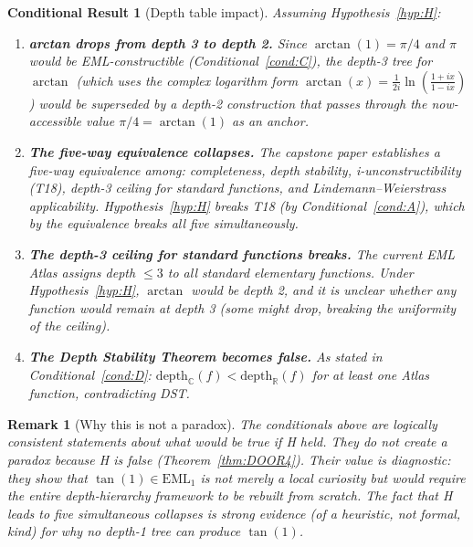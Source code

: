 \documentclass[11pt]{article}
\newtheorem{remark}{Remark}
\newtheorem{conditional}{Conditional Result}
\newcommand{\EML}[1]{\mathrm{EML}_{#1}}
\newcommand{\depthR}{\mathrm{depth}_{\mathbb{R}}}
\newcommand{\depthC}{\mathrm{depth}_{\mathbb{C}}}
\begin{document}
\begin{conditional}[Depth table impact]\label{cond:E}
\emph{Assuming Hypothesis~\ref{hyp:H}:}
\begin{enumerate}
  \item[(E1)] \textbf{arctan drops from depth 3 to depth 2.}
    Since $\arctan(1) = \pi/4$ and $\pi$ would be EML-constructible
    (Conditional~\ref{cond:C}), the depth-3 tree for $\arctan$ (which uses
    the complex logarithm form $\arctan(x) = \tfrac{1}{2i}\ln\!\left(\tfrac{1+ix}{1-ix}\right)$)
    would be superseded by a depth-2 construction that passes through the
    now-accessible value $\pi/4 = \arctan(1)$ as an anchor.

  \item[(E2)] \textbf{The five-way equivalence collapses.}
    The capstone paper establishes a five-way equivalence among:
    completeness, depth stability, i-unconstructibility (T18), depth-3 ceiling
    for standard functions, and Lindemann–Weierstrass applicability.
    Hypothesis~\ref{hyp:H} breaks T18 (by Conditional~\ref{cond:A}), which by
    the equivalence breaks all five simultaneously.

  \item[(E3)] \textbf{The depth-3 ceiling for standard functions breaks.}
    The current EML Atlas assigns depth $\leq 3$ to all standard elementary
    functions.  Under Hypothesis~\ref{hyp:H}, $\arctan$ would be depth 2, and
    it is unclear whether any function would remain at depth 3 (some might
    drop, breaking the uniformity of the ceiling).

  \item[(E4)] \textbf{The Depth Stability Theorem becomes false.}
    As stated in Conditional~\ref{cond:D}: $\depthC(f) < \depthR(f)$ for
    at least one Atlas function, contradicting DST.
\end{enumerate}
\end{conditional}

\begin{remark}[Why this is not a paradox]
The conditionals above are logically consistent statements about what would be
true \emph{if} H held.  They do not create a paradox because H is false
(Theorem~\ref{thm:DOOR4}).  Their value is diagnostic: they show that
$\tan(1) \in \EML{1}$ is not merely a local curiosity but would require the
entire depth-hierarchy framework to be rebuilt from scratch.  The fact that H
leads to five simultaneous collapses is strong evidence (of a heuristic,
not formal, kind) for why no depth-1 tree can produce $\tan(1)$.
\end{remark}
\end{document}

